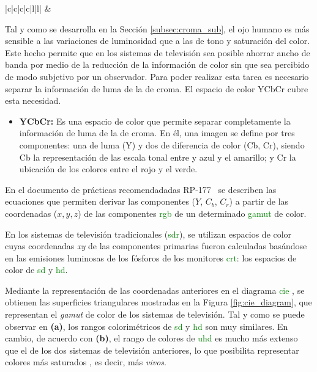 \documentclass[a4paper, 12pt]{report}
\begin{document}
\begin{table}[H]
{\begin{tabular}{|c|c|c|c|l|l|}
 &                                                                                                                                                                               \\ \hline
\end{tabular}%
}
\caption{Coordenadas \textit{(x,y)} en los sistemas de televisión SD, HD y UHD.}
\label{TABLE:COL_TV}
\end{table}

Tal y como se desarrolla en la Sección \ref{subsec:croma_sub}, el ojo humano es más sensible a las variaciones de luminosidad que a las de tono y saturación del color. Este hecho permite que en los sistemas de televisión sea posible ahorrar ancho de banda por medio de la reducción de la información de color sin que sea percibido de modo subjetivo por un observador. Para poder realizar esta tarea es necesario separar la información de luma de la de croma. El espacio de color YCbCr cubre esta necesidad.

\begin{itemize}
    \item \textbf{YCbCr:} Es una espacio de color que permite separar completamente la información de luma de la de croma. En él, una imagen se define por tres componentes:  una de luma (Y) y dos de diferencia de color (Cb, Cr), siendo Cb la representación de las escala tonal entre y azul y el amarillo; y Cr la ubicación de los colores entre el rojo y el verde.
\end{itemize}
En el documento de prácticas recomendadadas RP-177~\cite{smpte:_rp177} se describen las ecuaciones que permiten derivar las componentes ($Y$, $C_{b}$, $C_{r}$) a partir de las coordenadas ($x,y,z$) de las componentes \textcolor{green}{rgb} de un determinado \textcolor{green}{gamut} de color.

En los sistemas de televisión tradicionales (\textcolor{green}{sdr}), se utilizan espacios de color cuyas coordenadas \textit{xy} de las componentes primarias fueron calculadas basándose en las emisiones luminosas de los fósforos de los monitores \textcolor{green}{crt}: los espacios de color de \textcolor{green}{sd} y \textcolor{green}{hd}.

Mediante la representación de las coordenadas anteriores en el diagrama \textcolor{green}{cie} , se obtienen las superficies triangulares mostradas en la Figura  \ref{fig:cie_diagram}, que representan el \textit{gamut} de color de los sistemas de televisión. Tal y como se puede observar en \textbf{(a)}, los rangos colorimétricos de \textcolor{green}{sd} y \textcolor{green}{hd} son muy similares. En cambio, de acuerdo con \textbf{(b)}, el rango de colores  de \textcolor{green}{uhd} es mucho más extenso que el de los dos sistemas de televisión anteriores, lo que posibilita representar colores más saturados , es decir, más \textit{vivos}.
\end{document}
